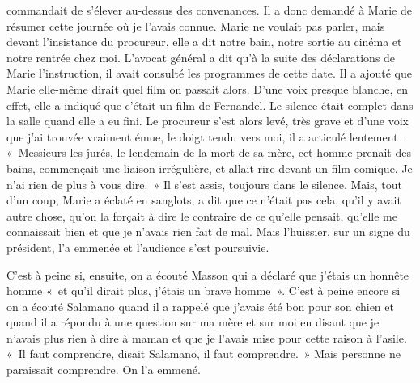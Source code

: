 \documentclass[french,twoside]{book} %
\begin{document}
commandait de s’élever au-dessus des convenances. Il a donc demandé à Marie de résumer cette journée où je l’avais connue. Marie ne voulait pas parler, mais devant l’insistance du procureur, elle a dit notre bain, notre sortie au cinéma et notre rentrée chez moi. L'avocat général a dit qu’à la suite des déclarations de Marie l’instruction, il avait consulté les programmes de cette date. Il a ajouté que Marie elle-même dirait quel film on passait alors. D'une voix presque blanche, en effet, elle a indiqué que c’était un film de Fernandel. Le silence était complet dans la salle quand elle a eu fini. Le procureur s’est alors levé, très grave et d’une voix que j’ai trouvée vraiment émue, le doigt tendu vers moi, il a articulé lentement : « Messieurs les jurés, le lendemain de la mort de sa mère, cet homme prenait des bains, commençait une liaison irrégulière, et allait rire devant un film comique. Je n’ai rien de plus à vous dire. » Il s’est assis, toujours dans le silence. Mais, tout d’un coup, Marie a éclaté en sanglots, a dit que ce n’était pas cela, qu’il y avait autre chose, qu’on la forçait à dire le contraire de ce qu’elle pensait, qu’elle me connaissait bien et que je n’avais rien fait de mal. Mais l’huissier, sur un signe du président, l’a emmenée et l’audience s’est poursuivie.\par
C'est à peine si, ensuite, on a écouté Masson qui a déclaré que j’étais un honnête homme « et qu’il dirait plus, j’étais un brave homme ». C'est à peine encore si on a écouté Salamano quand il a rappelé que j’avais été bon pour son chien et quand il a répondu à une question sur ma mère et sur moi en disant que je n’avais plus rien à dire à maman et que je l’avais mise pour cette raison à l’asile. « Il faut comprendre, disait Salamano, il faut comprendre. » Mais personne ne paraissait comprendre. On l’a emmené.\par
\end{document}
